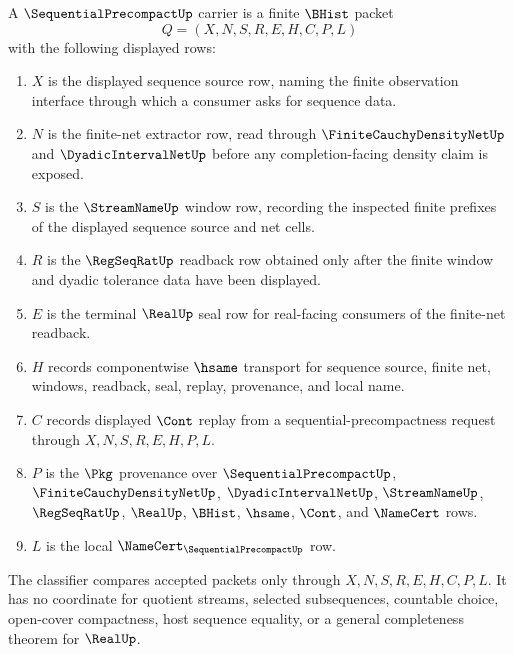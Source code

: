 \begin{definition}
\label{def:sequential-precompact-carrier}
A $\SequentialPrecompactUp$ carrier is a finite $\BHist$ packet
$$
Q=(X,N,S,R,E,H,C,P,L)
$$
with the following displayed rows:
\begin{enumerate}
\item $X$ is the displayed sequence source row, naming the finite observation interface through which a consumer asks for sequence data.
\item $N$ is the finite-net extractor row, read through $\FiniteCauchyDensityNetUp$ and $\DyadicIntervalNetUp$ before any completion-facing density claim is exposed.
\item $S$ is the $\StreamNameUp$ window row, recording the inspected finite prefixes of the displayed sequence source and net cells.
\item $R$ is the $\RegSeqRatUp$ readback row obtained only after the finite window and dyadic tolerance data have been displayed.
\item $E$ is the terminal $\RealUp$ seal row for real-facing consumers of the finite-net readback.
\item $H$ records componentwise $\hsame$ transport for sequence source, finite net, windows, readback, seal, replay, provenance, and local name.
\item $C$ records displayed $\Cont$ replay from a sequential-precompactness request through $X,N,S,R,E,H,P,L$.
\item $P$ is the $\Pkg$ provenance over $\SequentialPrecompactUp$, $\FiniteCauchyDensityNetUp$, $\DyadicIntervalNetUp$, $\StreamNameUp$, $\RegSeqRatUp$, $\RealUp$, $\BHist$, $\hsame$, $\Cont$, and $\NameCert$ rows.
\item $L$ is the local $\NameCert_{\SequentialPrecompactUp}$ row.
\end{enumerate}
The classifier compares accepted packets only through $X,N,S,R,E,H,C,P,L$. It has no coordinate for quotient streams, selected subsequences, countable choice, open-cover compactness, host sequence equality, or a general completeness theorem for $\RealUp$.
\end{definition}

